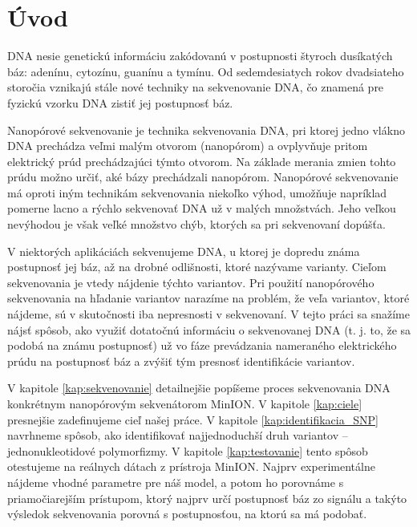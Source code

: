 \chapter*{Úvod} %

DNA nesie genetickú informáciu zakódovanú v postupnosti štyroch
dusíkatých báz: adenínu, cytozínu, guanínu a tymínu.
Od sedemdesiatych rokov dvadsiateho storočia vznikajú stále nové
techniky na sekvenovanie DNA, čo znamená pre fyzickú vzorku DNA zistiť
jej postupnosť báz.

Nanopórové sekvenovanie je technika sekvenovania DNA, pri ktorej jedno vlákno
DNA prechádza veľmi malým otvorom (nanopórom) a ovplyvňuje pritom elektrický
prúd prechádzajúci týmto otvorom. Na základe merania
zmien tohto prúdu možno určiť, aké bázy prechádzali nanopórom. Nanopórové sekvenovanie
má oproti iným technikám sekvenovania niekoľko výhod,
umožňuje napríklad pomerne lacno a rýchlo sekvenovať DNA už v malých množstvách.
Jeho veľkou nevýhodou je však veľké množstvo chýb, ktorých sa pri sekvenovaní dopúšťa.

V niektorých aplikáciách sekvenujeme DNA, u ktorej je dopredu známa postupnosť jej báz, až na 
drobné odlišnosti, ktoré nazývame varianty.
Cieľom sekvenovania je vtedy nájdenie týchto variantov. Pri použití
nanopórového sekvenovania na hľadanie variantov narazíme na problém, že veľa
variantov, ktoré nájdeme, sú v skutočnosti iba nepresnosti v sekvenovaní. V tejto
práci sa snažíme nájsť spôsob, ako využiť dotatočnú informáciu o sekvenovanej DNA
(t. j. to, že sa podobá na známu postupnosť) už vo fáze prevádzania nameraného elektrického
prúdu na postupnosť báz a zvýšiť tým presnosť identifikácie variantov.

V kapitole \ref{kap:sekvenovanie} detailnejšie popíšeme proces sekvenovania DNA konkrétnym 
nanopórovým sekvenátorom MinION. V kapitole \ref{kap:ciele} presnejšie zadefinujeme cieľ našej
práce.
V kapitole \ref{kap:identifikacia_SNP} navrhneme spôsob, ako identifikovať najjednoduchší
druh variantov -- jednonukleotidové polymorfizmy.
V kapitole \ref{kap:testovanie} tento spôsob otestujeme na reálnych dátach z prístroja MinION.
 Najprv experimentálne nájdeme vhodné parametre pre náš model, a potom
ho porovnáme s priamočiarejším prístupom, ktorý najprv určí postupnosť báz zo signálu a takýto výsledok sekvenovania porovná
s postupnosťou, na ktorú sa má podobať.
